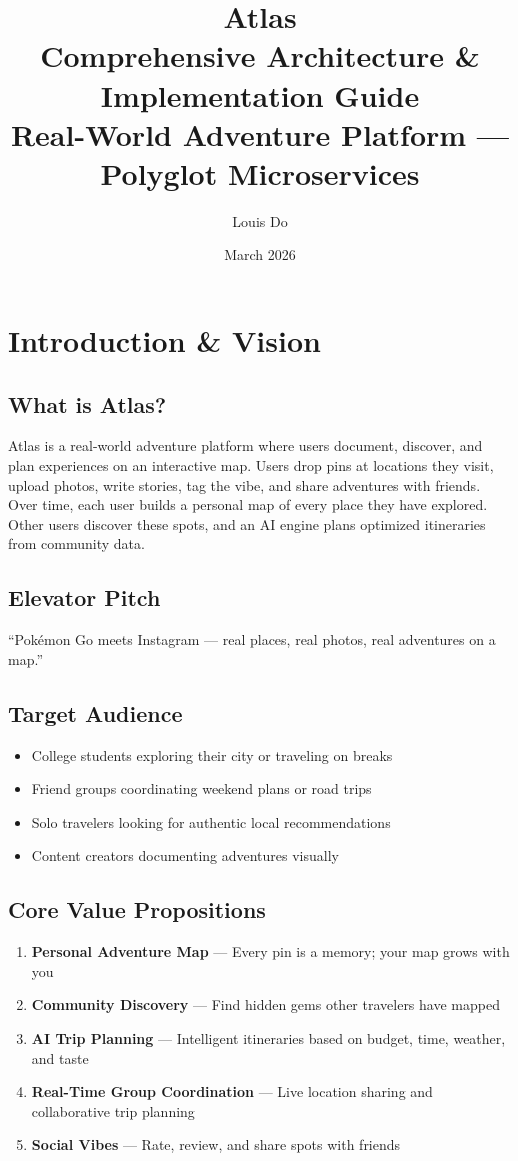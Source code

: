 \documentclass[12pt,letterpaper]{article}
\title{\Huge\textbf{Atlas}\\[10pt]\Large Comprehensive Architecture \& Implementation Guide\\[5pt]\normalsize Real-World Adventure Platform --- Polyglot Microservices}
\author{Louis Do}
\date{March 2026}
\begin{document}
\maketitle
\tableofcontents
\newpage

\section{Introduction \& Vision}

\subsection{What is Atlas?}
Atlas is a real-world adventure platform where users document, discover, and plan experiences on an interactive map. Users drop pins at locations they visit, upload photos, write stories, tag the vibe, and share adventures with friends. Over time, each user builds a personal map of every place they have explored. Other users discover these spots, and an AI engine plans optimized itineraries from community data.

\subsection{Elevator Pitch}
``Pok\'emon Go meets Instagram --- real places, real photos, real adventures on a map.''

\subsection{Target Audience}
\begin{itemize}
  \item College students exploring their city or traveling on breaks
  \item Friend groups coordinating weekend plans or road trips
  \item Solo travelers looking for authentic local recommendations
  \item Content creators documenting adventures visually
\end{itemize}

\subsection{Core Value Propositions}
\begin{enumerate}
  \item \textbf{Personal Adventure Map} --- Every pin is a memory; your map grows with you
  \item \textbf{Community Discovery} --- Find hidden gems other travelers have mapped
  \item \textbf{AI Trip Planning} --- Intelligent itineraries based on budget, time, weather, and taste
  \item \textbf{Real-Time Group Coordination} --- Live location sharing and collaborative trip planning
  \item \textbf{Social Vibes} --- Rate, review, and share spots with friends
\end{enumerate}
\end{document}
